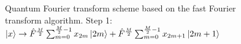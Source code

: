 \begin{figure}
\centering



\caption{Quantum Fourier transform scheme based on the fast Fourier transform algorithm. Step 1: 
$\ket{x} \rightarrow
\hat{F}^{\frac{M}{2}} \sum_{m = 0}^{\frac{M}{2} - 1}x_{2m} \ket{2m} +
\hat{F}^{\frac{M}{2}} \sum_{m = 0}^{\frac{M}{2} - 1}x_{2m + 1} \ket{2m+1}$}
\label{figQuantCompQuantFourier1}
\end{figure}